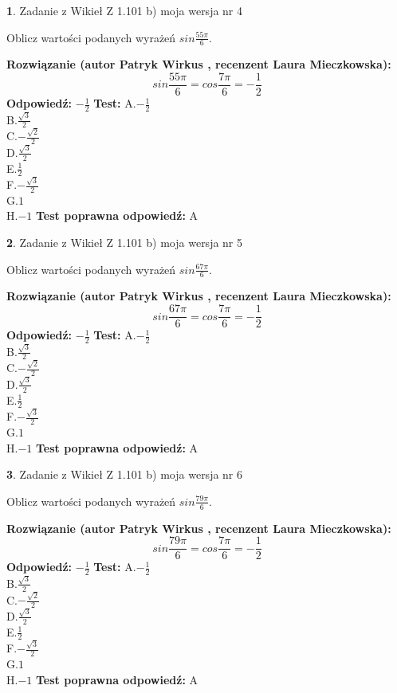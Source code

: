 \documentclass[12pt, a4paper]{article}
\theoremstyle{definition} %
\newtheorem{zad}{}
\newcommand{\zadStart}[1]{\begin{zad}#1\newline}
\newcommand{\zadStop}{\end{zad}}
\newcommand{\rozwStart}[2]{\noindent \textbf{Rozwiązanie (autor #1 , recenzent #2): }\newline}
\newcommand{\rozwStop}{\newline}
\newcommand{\odpStart}{\noindent \textbf{Odpowiedź:}\newline}
\newcommand{\odpStop}{\newline}
\newcommand{\testStart}{\noindent \textbf{Test:}\newline}
\newcommand{\testStop}{\newline}
\newcommand{\kluczStart}{\noindent \textbf{Test poprawna odpowiedź:}\newline}
\newcommand{\kluczStop}{\newline}
\begin{document}
\zadStart{Zadanie z Wikieł Z 1.101 b) moja wersja nr 4}

Oblicz wartości podanych wyrażeń $sin \frac{55\pi}{6}$.
\zadStop
\rozwStart{Patryk Wirkus}{Laura Mieczkowska}
$$sin \frac{55\pi}{6} = cos \frac{7\pi}{6} = -\frac{1}{2}$$
\rozwStop
\odpStart
$-\frac{1}{2}$
\odpStop
\testStart
A.$-\frac{1}{2}$\\
B.$\frac{\sqrt{3}}{2}$\\
C.$-\frac{\sqrt{2}}{2}$\\
D.$\frac{\sqrt{3}}{2}$\\
E.$\frac{1}{2}$\\
F.$-\frac{\sqrt{3}}{2}$\\
G.$1$\\
H.$-1$
\testStop
\kluczStart
A
\kluczStop



\zadStart{Zadanie z Wikieł Z 1.101 b) moja wersja nr 5}

Oblicz wartości podanych wyrażeń $sin \frac{67\pi}{6}$.
\zadStop
\rozwStart{Patryk Wirkus}{Laura Mieczkowska}
$$sin \frac{67\pi}{6} = cos \frac{7\pi}{6} = -\frac{1}{2}$$
\rozwStop
\odpStart
$-\frac{1}{2}$
\odpStop
\testStart
A.$-\frac{1}{2}$\\
B.$\frac{\sqrt{3}}{2}$\\
C.$-\frac{\sqrt{2}}{2}$\\
D.$\frac{\sqrt{3}}{2}$\\
E.$\frac{1}{2}$\\
F.$-\frac{\sqrt{3}}{2}$\\
G.$1$\\
H.$-1$
\testStop
\kluczStart
A
\kluczStop



\zadStart{Zadanie z Wikieł Z 1.101 b) moja wersja nr 6}

Oblicz wartości podanych wyrażeń $sin \frac{79\pi}{6}$.
\zadStop
\rozwStart{Patryk Wirkus}{Laura Mieczkowska}
$$sin \frac{79\pi}{6} = cos \frac{7\pi}{6} = -\frac{1}{2}$$
\rozwStop
\odpStart
$-\frac{1}{2}$
\odpStop
\testStart
A.$-\frac{1}{2}$\\
B.$\frac{\sqrt{3}}{2}$\\
C.$-\frac{\sqrt{2}}{2}$\\
D.$\frac{\sqrt{3}}{2}$\\
E.$\frac{1}{2}$\\
F.$-\frac{\sqrt{3}}{2}$\\
G.$1$\\
H.$-1$
\testStop
\kluczStart
A
\kluczStop
\end{document}
